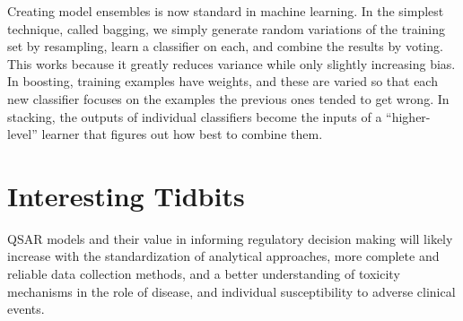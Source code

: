 Creating model ensembles is now standard in machine learning. In the simplest technique, called bagging, we simply generate random variations of the training set by resampling, learn a classifier on each, and combine the results by voting. This works because it greatly reduces variance while only slightly increasing bias. In boosting, training examples have weights, and these are varied so that each new classifier focuses on the examples the previous ones tended to get wrong. In stacking, the outputs of individual classifiers become the inputs of a “higher-level” learner that figures out how best to combine them.\cite{Domingos2012}


\section{Interesting Tidbits}



QSAR models and their value in informing regulatory decision making will likely increase with the standardization of analytical approaches, more complete and reliable data collection methods, and a better understanding of toxicity mechanisms in the role of disease, and individual susceptibility to adverse clinical events.\cite{Kruhlak2012}

